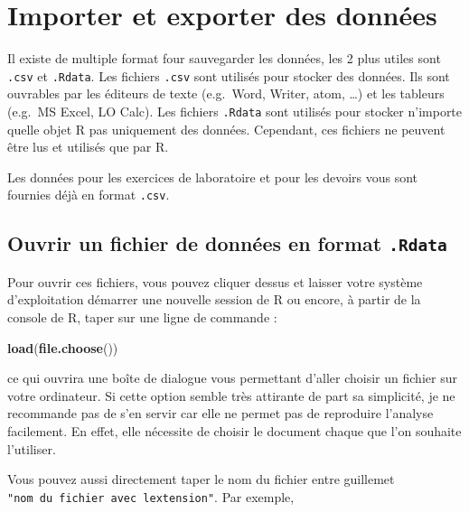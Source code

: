 \documentclass[12pt,]{book}
\newenvironment{Shaded}{\begin{snugshade}}{\end{snugshade}}
\newcommand{\KeywordTok}[1]{\textcolor[rgb]{0.27,0.27,0.27}{\textbf{#1}}}
\newcommand{\NormalTok}[1]{#1}
\begin{document}
\hypertarget{importer-et-exporter-des-donnuxe9es}{%
\section{Importer et exporter des données}\label{importer-et-exporter-des-donnuxe9es}}

Il existe de multiple format four sauvegarder les données, les 2 plus utiles sont \texttt{.csv} et \texttt{.Rdata}.
Les fichiers \texttt{.csv} sont utilisés pour stocker des données.
Ils sont ouvrables par les éditeurs de texte (e.g.~Word, Writer, atom, \ldots{}) et les tableurs (e.g.~MS Excel, LO Calc).
Les fichiers \texttt{.Rdata} sont utilisés pour stocker n'importe quelle objet R pas uniquement des données.
Cependant, ces fichiers ne peuvent être lus et utilisés que par R.

Les données pour les exercices de laboratoire et pour les devoirs vous sont fournies déjà en format \texttt{.csv}.

\hypertarget{ouvrir-un-fichier-de-donnuxe9es-en-format-.rdata}{%
\subsection{\texorpdfstring{Ouvrir un fichier de données en format \texttt{.Rdata}}{Ouvrir un fichier de données en format .Rdata}}\label{ouvrir-un-fichier-de-donnuxe9es-en-format-.rdata}}

Pour ouvrir ces fichiers, vous pouvez cliquer dessus et laisser votre système d'exploitation démarrer une nouvelle session de R ou encore, à partir de la console de R, taper sur une ligne de commande :

\begin{Shaded}
\begin{Highlighting}[]
\KeywordTok{load}\NormalTok{(}\KeywordTok{file.choose}\NormalTok{())}
\end{Highlighting}
\end{Shaded}

ce qui ouvrira une boîte de dialogue vous permettant d'aller choisir un fichier sur votre ordinateur.
Si cette option semble très attirante de part sa simplicité, je ne recommande pas de s'en servir car elle ne permet pas de reproduire l'analyse facilement. En effet, elle nécessite de choisir le document chaque que l'on souhaite l'utiliser.

Vous pouvez aussi directement taper le nom du fichier entre guillemet \texttt{"nom\ du\ fichier\ avec\ l\textquotesingle{}extension"}.
Par exemple,
\end{document}
